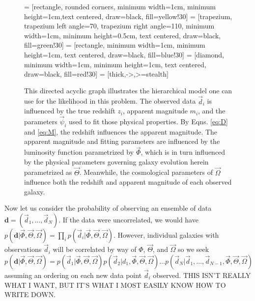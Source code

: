 \documentclass[12pt, onecolumn]{emulateapj}
\begin{document}
\begin{figure}
\begin{center}
\label{fig:flow}
 = [rectangle, rounded corners, minimum width=1cm, minimum height=1cm,text centered, draw=black, fill=yellow!30]
 = [trapezium, trapezium left angle=70, trapezium right angle=110, minimum width=1cm, minimum height=0.5cm, text centered, draw=black, fill=green!30]
 = [rectangle, minimum width=1cm, minimum height=1cm, text centered, draw=black, fill=blue!30]
 = [diamond, minimum width=1cm, minimum height=1cm, text centered, draw=black, fill=red!30]
 = [thick,->,>=stealth]

\caption{This directed acyclic graph illustrates the hierarchical model one can use for the likelihood in this problem.  The observed data $\vec{d}_{i}$ is influenced by the true redshift $z_{i}$, apparent magnitude $m_{i}$, and the parameters $\vec{\psi}_{i}$ used to fit those physical properties.  By Eqns. \ref{eq:D} and \ref{eq:M}, the redshift influences the apparent magnitude.  The apparent magnitude and fitting parameters are influenced by the luminosity function parametrized by $\vec{\Phi}$, which is in turn influenced by the physical parameters governing galaxy evolution herein parametrized as $\vec{\Theta}$.  Meanwhile, the cosmological parameters of $\vec{\Omega}$ influence both the redshift and apparent magnitude of each observed galaxy.}
\end{center}
\end{figure}

Now let us consider the probability of observing an ensemble of data $\textbf{d}=(\vec{d}_{1},\dots,\vec{d}_{N})$.  If the data were uncorrelated, we would have $p(\textbf{d}|\vec{\Phi},\vec{\Theta},\vec{\Omega})=\prod_{i}p(\vec{d}_{i}|\vec{\Phi},\vec{\Theta},\vec{\Omega})$.  However, individual galaxies with observations $\vec{d}_{i}$ will be correlated by way of $\Phi$, $\vec{\Theta}$, and $\vec{\Omega}$ so we seek $p(\textbf{d}|\vec{\Phi},\vec{\Theta},\vec{\Omega})=p(\vec{d}_{1}|\vec{\Phi},\vec{\Theta},\vec{\Omega})p(\vec{d}_{2}|d_{1},\vec{\Phi},\vec{\Theta},\vec{\Omega})\dots p(\vec{d}_{N}|\vec{d}_{1},\dots,\vec{d}_{N-1},\vec{\Phi},\vec{\Theta},\vec{\Omega})$ assuming an ordering on each new data point $\vec{d}_{i}$ observed.  THIS ISN'T REALLY WHAT I WANT, BUT IT'S WHAT I MOST EASILY KNOW HOW TO WRITE DOWN.  
\end{document}
